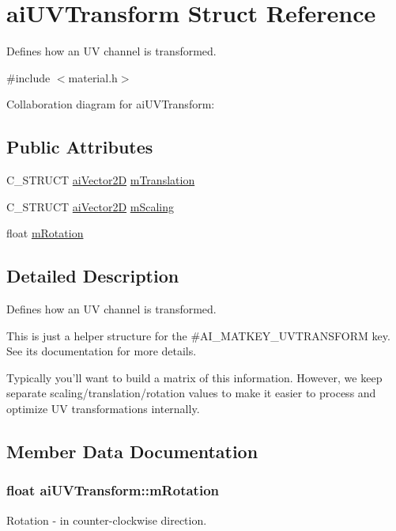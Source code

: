 \hypertarget{structai_u_v_transform}{\section{ai\-U\-V\-Transform Struct Reference}
\label{structai_u_v_transform}
}


Defines how an U\-V channel is transformed.  




{\ttfamily \#include $<$material.\-h$>$}



Collaboration diagram for ai\-U\-V\-Transform\-:
\subsection*{Public Attributes}
\begin{DoxyCompactItemize}
\item 
C\-\_\-\-S\-T\-R\-U\-C\-T \hyperlink{structai_vector2_d}{ai\-Vector2\-D} \hyperlink{structai_u_v_transform_a8c7f35959aa342bf0cef670246fbb813}{m\-Translation}
\item 
C\-\_\-\-S\-T\-R\-U\-C\-T \hyperlink{structai_vector2_d}{ai\-Vector2\-D} \hyperlink{structai_u_v_transform_a89429a027cbf914e7212e48149a957c8}{m\-Scaling}
\item 
float \hyperlink{structai_u_v_transform_aa8dcf39ccd39f786b3f5f163bd663792}{m\-Rotation}
\end{DoxyCompactItemize}


\subsection{Detailed Description}
Defines how an U\-V channel is transformed. 

This is just a helper structure for the \#\-A\-I\-\_\-\-M\-A\-T\-K\-E\-Y\-\_\-\-U\-V\-T\-R\-A\-N\-S\-F\-O\-R\-M key. See its documentation for more details.

Typically you'll want to build a matrix of this information. However, we keep separate scaling/translation/rotation values to make it easier to process and optimize U\-V transformations internally. 

\subsection{Member Data Documentation}
\hypertarget{structai_u_v_transform_aa8dcf39ccd39f786b3f5f163bd663792}{
\subsubsection[{m\-Rotation}]{\setlength{\rightskip}{0pt plus 5cm}float ai\-U\-V\-Transform\-::m\-Rotation}}\label{structai_u_v_transform_aa8dcf39ccd39f786b3f5f163bd663792}
Rotation -\/ in counter-\/clockwise direction.

